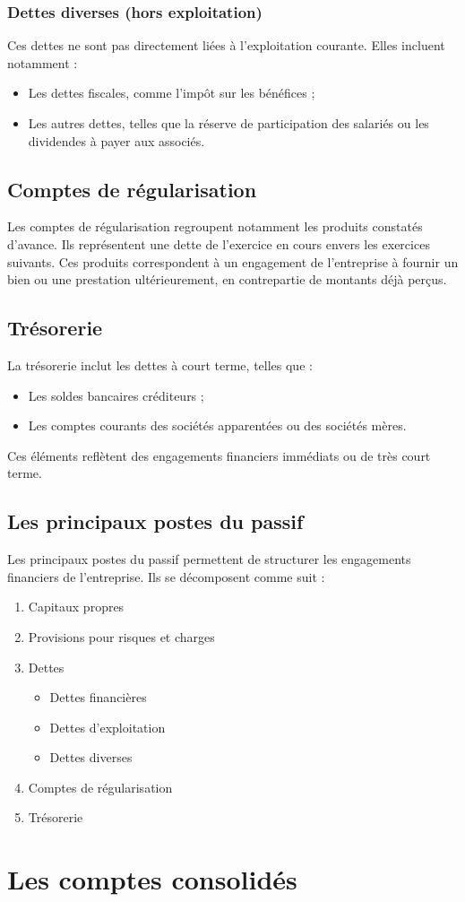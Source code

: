 \documentclass[a4paper, 12pt]{report}
\begin{document}
\subsubsection{Dettes diverses (hors exploitation)}

Ces dettes ne sont pas directement liées à l’exploitation courante. Elles incluent notamment :  

\begin{itemize}
	\item Les dettes fiscales, comme l’impôt sur les bénéfices ;  
	\item Les autres dettes, telles que la réserve de participation des salariés ou les dividendes à payer aux associés.   
\end{itemize}

\subsection{Comptes de régularisation}

Les comptes de régularisation regroupent notamment les produits constatés d'avance. Ils représentent une dette de l'exercice en cours envers les exercices suivants. Ces produits correspondent à un engagement de l'entreprise à fournir un bien ou une prestation ultérieurement, en contrepartie de montants déjà perçus.

\subsection{Trésorerie}

La trésorerie inclut les dettes à court terme, telles que :  
\begin{itemize}
	\item Les soldes bancaires créditeurs ;  
	\item Les comptes courants des sociétés apparentées ou des sociétés mères.  
\end{itemize}
Ces éléments reflètent des engagements financiers immédiats ou de très court terme.

\subsection{Les principaux postes du passif}

Les principaux postes du passif permettent de structurer les engagements financiers de l'entreprise. Ils se décomposent comme suit : 

\begin{enumerate}
	\item Capitaux propres
	\item Provisions pour risques et charges
	\item Dettes
	\begin{itemize}
		\item Dettes financières
		\item Dettes d'exploitation
		\item Dettes diverses
	\end{itemize}
	\item Comptes de régularisation
	\item Trésorerie
\end{enumerate}

\section{Les comptes consolidés}
\end{document}
